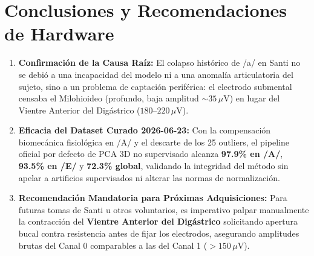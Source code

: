 \documentclass[11pt,a4paper]{article}
\begin{document}
\section{Conclusiones y Recomendaciones de Hardware}

\begin{enumerate}
    \item \textbf{Confirmación de la Causa Raíz:} El colapso histórico de /a/ en Santi no se debió a una incapacidad del modelo ni a una anomalía articulatoria del sujeto, sino a un problema de captación periférica: el electrodo submental censaba el Milohioideo (profundo, baja amplitud $\sim 35\,\mu\text{V}$) en lugar del Vientre Anterior del Digástrico ($180\text{--}220\,\mu\text{V}$).
    \item \textbf{Eficacia del Dataset Curado 2026-06-23:} Con la compensación biomecánica fisiológica en /A/ y el descarte de los 25 outliers, el pipeline oficial por defecto de PCA 3D no supervisado alcanza \textbf{97.9\% en /A/}, \textbf{93.5\% en /E/} y \textbf{72.3\% global}, validando la integridad del método sin apelar a artificios supervisados ni alterar las normas de normalización.
    \item \textbf{Recomendación Mandatoria para Próximas Adquisiciones:} Para futuras tomas de Santi u otros voluntarios, es imperativo palpar manualmente la contracción del \textbf{Vientre Anterior del Digástrico} solicitando apertura bucal contra resistencia antes de fijar los electrodos, asegurando amplitudes brutas del Canal 0 comparables a las del Canal 1 ($>150\,\mu\text{V}$).
\end{enumerate}
\end{document}
